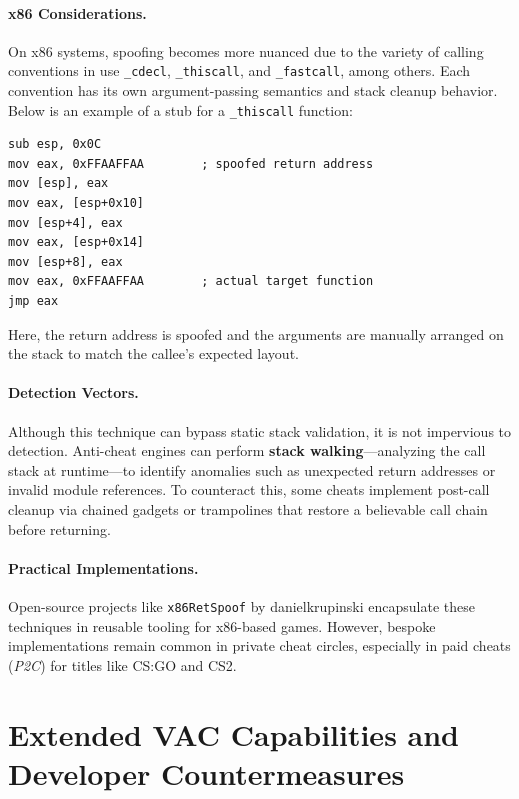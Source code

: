\paragraph{x86 Considerations.} On x86 systems, spoofing becomes more nuanced due to the variety of calling conventions in use \texttt{\_cdecl}, \texttt{\_thiscall}, and \texttt{\_fastcall}, among others. Each convention has its own argument-passing semantics and stack cleanup behavior. Below is an example of a stub for a \texttt{\_thiscall} function:
\begin{lstlisting}[style=asmstyle]
sub esp, 0x0C
mov eax, 0xFFAAFFAA        ; spoofed return address
mov [esp], eax
mov eax, [esp+0x10]
mov [esp+4], eax
mov eax, [esp+0x14]
mov [esp+8], eax
mov eax, 0xFFAAFFAA        ; actual target function
jmp eax
\end{lstlisting}

Here, the return address is spoofed and the arguments are manually arranged on the stack to match the callee's expected layout.

\paragraph{Detection Vectors.} Although this technique can bypass static stack validation, it is not impervious to detection. Anti-cheat engines can perform \textbf{stack walking}—analyzing the call stack at runtime—to identify anomalies such as unexpected return addresses or invalid module references. To counteract this, some cheats implement post-call cleanup via chained gadgets or trampolines that restore a believable call chain before returning.

\paragraph{Practical Implementations.} Open-source projects like \texttt{x86RetSpoof} by danielkrupinski encapsulate these techniques in reusable tooling for x86-based games. However, bespoke implementations remain common in private cheat circles, especially in paid cheats (\textit{P2C}) for titles like CS:GO and CS2.







\section{Extended VAC Capabilities and Developer Countermeasures}


